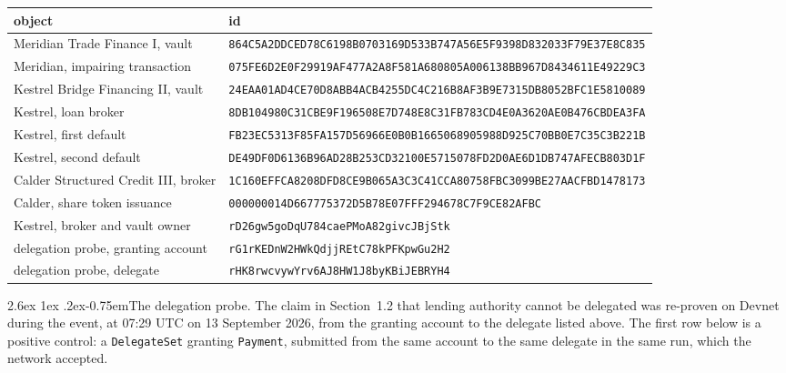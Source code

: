 \documentclass[11pt]{article}
\makeatletter
\renewcommand{\arraystretch}{1.22}
\renewcommand\paragraph{\@startsection{paragraph}{4}{\z@}%
  {2.6ex \@plus 1ex \@minus .2ex}{-0.75em}{\normalfont\normalsize\bfseries}}
\theoremstyle{orma}
\theoremstyle{ormaupright}
\makeatother
\begin{document}
\begin{center}
\scriptsize
\setlength{\tabcolsep}{6pt}
\renewcommand{\arraystretch}{1.35}
\begin{tabular}{ll}
\toprule
object & id \\
\midrule
Meridian Trade Finance I, vault & \texttt{864C5A2DDCED78C6198B0703169D533B747A56E5F9398D832033F79E37E8C835} \\
Meridian, impairing transaction & \texttt{075FE6D2E0F29919AF477A2A8F581A680805A006138BB967D8434611E49229C3} \\
Kestrel Bridge Financing II, vault & \texttt{24EAA01AD4CE70D8ABB4ACB4255DC4C216B8AF3B9E7315DB8052BFC1E5810089} \\
Kestrel, loan broker & \texttt{8DB104980C31CBE9F196508E7D748E8C31FB783CD4E0A3620AE0B476CBDEA3FA} \\
Kestrel, first default & \texttt{FB23EC5313F85FA157D56966E0B0B1665068905988D925C70BB0E7C35C3B221B} \\
Kestrel, second default & \texttt{DE49DF0D6136B96AD28B253CD32100E5715078FD2D0AE6D1DB747AFECB803D1F} \\
Calder Structured Credit III, broker & \texttt{1C160EFFCA8208DFD8CE9B065A3C3C41CCA80758FBC3099BE27AACFBD1478173} \\
Calder, share token issuance & \texttt{000000014D667775372D5B78E07FFF294678C7F9CE82AFBC} \\
Kestrel, broker and vault owner & \texttt{rD26gw5goDqU784caePMoA82givcJBjStk} \\
delegation probe, granting account & \texttt{rG1rKEDnW2HWkQdjjREtC78kPFKpwGu2H2} \\
delegation probe, delegate & \texttt{rHK8rwcvywYrv6AJ8HW1J8byKBiJEBRYH4} \\
\bottomrule
\end{tabular}
\end{center}

\paragraph{The delegation probe.} The claim in Section~1.2 that lending authority cannot be
delegated was re-proven on Devnet during the event, at 07:29 UTC on 13 September 2026,
from the granting account to the delegate listed above. The first row below is a positive
control: a \texttt{DelegateSet} granting \texttt{Payment}, submitted from the same account to
the same delegate in the same run, which the network accepted.
\end{document}
